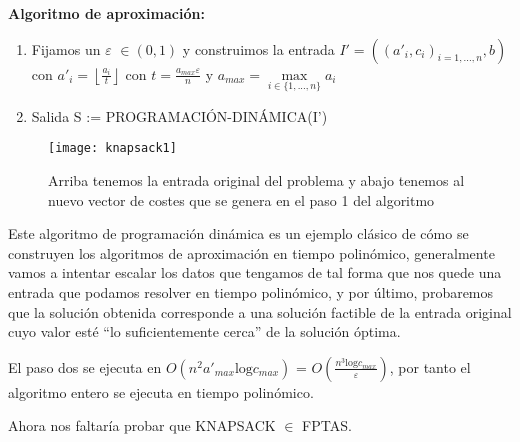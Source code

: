 \documentclass[a4paper,12pt,titlepage]{article}
\begin{document}
\textbf{Algoritmo de aproximaci\'on:}\cite{knapsack2}
\begin{enumerate}
\item Fijamos un $\varepsilon$ $\in (0,1)$ y construimos la entrada $I' = ((a'_i,c_i)_{i=1,...,n},b)$ con $a'_i = \left\lfloor \frac{a_{i}}{t}\right\rfloor$ con $t=\frac{a_{max}\varepsilon}{n}$ y $a_{max} = \max\limits_{i\in\{1,...,n\}}a_i$
\item Salida S := PROGRAMACI\'ON-DIN\'AMICA(I')
\end{enumerate}

\begin{figure}[h]
\centering
\texttt{[image: knapsack1]}
\caption{Arriba tenemos la entrada original del problema y abajo tenemos al nuevo vector de costes que se genera en el paso 1 del algoritmo}
\end{figure}

Este algoritmo de programaci\'on din\'amica es un ejemplo cl\'asico de c\'omo se construyen los algoritmos de aproximaci\'on en tiempo polin\'omico, generalmente vamos a intentar escalar los datos que tengamos de tal forma que nos quede una entrada que podamos resolver en tiempo polin\'omico, y por \'ultimo, probaremos que la soluci\'on obtenida corresponde a una soluci\'on factible de la entrada original cuyo valor est\'e ``lo suficientemente cerca'' de la soluci\'on \'optima.

El paso dos se ejecuta en $O(n^{2}a'_{max}\text{log}c_{max})$ = $O(\frac{n^{3}\text{log}c_{max}}{\varepsilon})$, por tanto el algoritmo entero se ejecuta en tiempo polin\'omico.

Ahora nos faltar\'ia probar que KNAPSACK $\in$ FPTAS.
\end{document}
